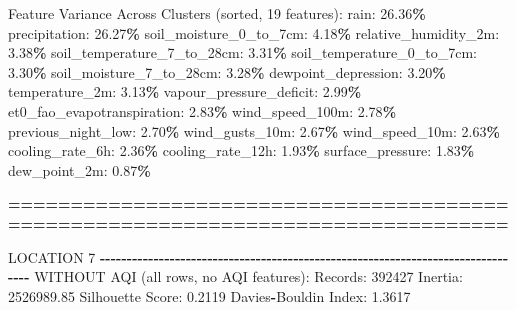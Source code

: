 \documentclass[
  letterpaper,
  DIV=11,
  numbers=noendperiod]{scrartcl}
\newenvironment{Shaded}{\begin{snugshade}}{\end{snugshade}}
\newcommand{\BuiltInTok}[1]{#1}
\newcommand{\DecValTok}[1]{\textcolor[rgb]{0.00,0.00,0.81}{#1}}
\newcommand{\FloatTok}[1]{\textcolor[rgb]{0.00,0.00,0.81}{#1}}
\newcommand{\NormalTok}[1]{#1}
\newcommand{\OperatorTok}[1]{\textcolor[rgb]{0.81,0.36,0.00}{\textbf{#1}}}
\begin{document}
\begin{Shaded}
\begin{Highlighting}[]
\NormalTok{  Feature Variance Across Clusters (}\BuiltInTok{sorted}\NormalTok{, }\DecValTok{19}\NormalTok{ features):}
\NormalTok{    rain: }\FloatTok{26.36}\OperatorTok{\%}
\NormalTok{    precipitation: }\FloatTok{26.27}\OperatorTok{\%}
\NormalTok{    soil\_moisture\_0\_to\_7cm: }\FloatTok{4.18}\OperatorTok{\%}
\NormalTok{    relative\_humidity\_2m: }\FloatTok{3.38}\OperatorTok{\%}
\NormalTok{    soil\_temperature\_7\_to\_28cm: }\FloatTok{3.31}\OperatorTok{\%}
\NormalTok{    soil\_temperature\_0\_to\_7cm: }\FloatTok{3.30}\OperatorTok{\%}
\NormalTok{    soil\_moisture\_7\_to\_28cm: }\FloatTok{3.28}\OperatorTok{\%}
\NormalTok{    dewpoint\_depression: }\FloatTok{3.20}\OperatorTok{\%}
\NormalTok{    temperature\_2m: }\FloatTok{3.13}\OperatorTok{\%}
\NormalTok{    vapour\_pressure\_deficit: }\FloatTok{2.99}\OperatorTok{\%}
\NormalTok{    et0\_fao\_evapotranspiration: }\FloatTok{2.83}\OperatorTok{\%}
\NormalTok{    wind\_speed\_100m: }\FloatTok{2.78}\OperatorTok{\%}
\NormalTok{    previous\_night\_low: }\FloatTok{2.70}\OperatorTok{\%}
\NormalTok{    wind\_gusts\_10m: }\FloatTok{2.67}\OperatorTok{\%}
\NormalTok{    wind\_speed\_10m: }\FloatTok{2.63}\OperatorTok{\%}
\NormalTok{    cooling\_rate\_6h: }\FloatTok{2.36}\OperatorTok{\%}
\NormalTok{    cooling\_rate\_12h: }\FloatTok{1.93}\OperatorTok{\%}
\NormalTok{    surface\_pressure: }\FloatTok{1.83}\OperatorTok{\%}
\NormalTok{    dew\_point\_2m: }\FloatTok{0.87}\OperatorTok{\%}

\OperatorTok{================================================================================}

\NormalTok{LOCATION }\DecValTok{7}
\OperatorTok{{-}{-}{-}{-}{-}{-}{-}{-}{-}{-}{-}{-}{-}{-}{-}{-}{-}{-}{-}{-}{-}{-}{-}{-}{-}{-}{-}{-}{-}{-}{-}{-}{-}{-}{-}{-}{-}{-}{-}{-}{-}{-}{-}{-}{-}{-}{-}{-}{-}{-}{-}{-}{-}{-}{-}{-}{-}{-}{-}{-}{-}{-}{-}{-}{-}{-}{-}{-}{-}{-}{-}{-}{-}{-}{-}{-}{-}{-}{-}{-}}
\NormalTok{WITHOUT AQI (}\BuiltInTok{all}\NormalTok{ rows, no AQI features):}
\NormalTok{  Records: }\DecValTok{392427}
\NormalTok{  Inertia: }\FloatTok{2526989.85}
\NormalTok{  Silhouette Score: }\FloatTok{0.2119}
\NormalTok{  Davies}\OperatorTok{{-}}\NormalTok{Bouldin Index: }\FloatTok{1.3617}


\end{Highlighting}
\end{Shaded}
\end{document}
